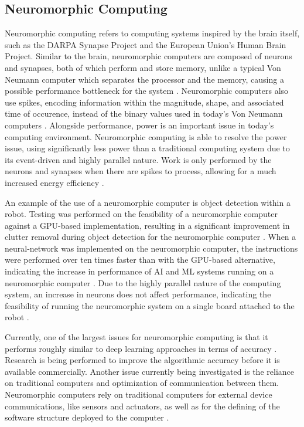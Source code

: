 \documentclass[twocolumn,12pt, singlespace]{IEEEtran}
\begin{document}
\subsection{Neuromorphic Computing}
Neuromorphic computing refers to computing systems inspired by the brain itself, such as the DARPA Synapse Project and the European Union's Human Brain Project. Similar to the brain, neuromorphic computers are composed of neurons and synapses, both of which perform and store memory, unlike a typical Von Neumann computer which separates the processor and the memory, causing a possible performance bottleneck for the system \cite{Schuman:2022}. Neuromorphic computers also use spikes, encoding information within the magnitude, shape, and associated time of occurence, instead of the binary values used in today's Von Neumann computers \cite{Schuman:2022}. Alongside performance, power is an important issue in today's computing environment. Neuromorphic computing is able to resolve the power issue, using significantly less power than a traditional computing system due to its event-driven and highly parallel nature. Work is only performed by the neurons and synapses when there are spikes to process, allowing for a much increased energy efficiency \cite{Schuman:2022}.

An example of the use of a neuromorphic computer is object detection within a robot. Testing was performed on the feasibility of a neuromorphic computer against a GPU-based implementation, resulting in a significant improvement in clutter removal during object detection for the neuromorphic computer \cite{DAngelo:2022}. When a neural-network was implemented on the neuromorphic computer, the instructions were performed over ten times faster than with the GPU-based alternative, indicating the increase in performance of AI and ML systems running on a neuromorphic computer \cite{DAngelo:2022}. Due to the highly parallel nature of the computing system, an increase in neurons does not affect performance, indicating the feasibility of running the neuromorphic system on a single board attached to the robot \cite{DAngelo:2022}.

Currently, one of the largest issues for neuromorphic computing is that it performs roughly similar to deep learning approaches in terms of accuracy \cite{Schuman:2022}. Research is being performed to improve the algorithmic accuracy before it is available commercially. Another issue currently being investigated is the reliance on traditional computers and optimization of communication between them. Neuromorphic computers rely on traditional computers for external device communications, like sensors and actuators, as well as for the defining of the software structure deployed to the computer \cite{Schuman:2022}.
\end{document}
